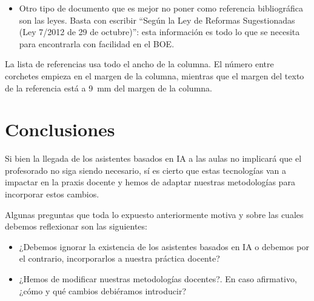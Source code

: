 \documentclass[twocolumn,twoside,a4paper, 10pt]{article}
\begin{document}
\begin{itemize}
	\item Otro tipo de documento que es mejor no poner como referencia 
	bibliográfica son las leyes. Basta con escribir ``Según la Ley de 
	Reformas Sugestionadas (Ley 7/2012 de 29 de octubre)'': esta 
	información es todo lo que se necesita para encontrarla con 
	facilidad en el BOE.
\end{itemize}

La lista de referencias usa todo el ancho de la columna.  El número 
entre corchetes empieza en el margen de la columna, mientras que el margen
del texto de la referencia está a 9~mm del margen de la columna.


\section{Conclusiones}
Si bien la llegada de los asistentes basados en IA a las aulas no implicará que el profesorado no siga siendo
necesario, sí es cierto que estas tecnologías van a impactar en la praxis docente y hemos de adaptar nuestras
metodologías para incorporar estos cambios.

Algunas preguntas que toda lo expuesto anteriormente motiva y sobre las cuales debemos reflexionar son las
siguientes:
\begin{itemize} 
\item ¿Debemos ignorar la existencia de los asistentes basados en IA o debemos por el contrario, incorporarlos a
    nuestra práctica docente?
\item ¿Hemos de modificar nuestras metodologías docentes?. En caso afirmativo, ¿cómo y qué cambios debiéramos
  introducir?
\end {itemize} 

\balance{}


\end{document}
